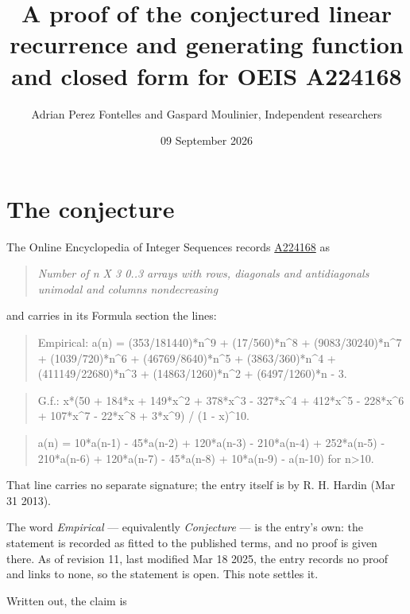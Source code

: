 \documentclass[11pt]{article}
\title{A proof of the conjectured linear recurrence and generating function and closed form for OEIS A224168}
\author{Adrian Perez Fontelles and Gaspard Moulinier, Independent researchers}
\date{09 September 2026}
\theoremstyle{definition}
\begin{document}
\maketitle
\section{The conjecture}

The Online Encyclopedia of Integer Sequences records \href{https://oeis.org/A224168}{A224168} as

\begin{quote}\itshape Number of n X 3 0..3 arrays with rows, diagonals and antidiagonals unimodal and columns nondecreasing\end{quote}

and carries in its Formula section the lines:

\begin{quote}\ttfamily Empirical: a(n) = (353/181440)*n\textasciicircum{}9 + (17/560)*n\textasciicircum{}8 + (9083/30240)*n\textasciicircum{}7 + (1039/720)*n\textasciicircum{}6 + (46769/8640)*n\textasciicircum{}5 + (3863/360)*n\textasciicircum{}4 + (411149/22680)*n\textasciicircum{}3 + (14863/1260)*n\textasciicircum{}2 + (6497/1260)*n - 3.\end{quote}

\begin{quote}\ttfamily G.f.: x*(50 + 184*x + 149*x\textasciicircum{}2 + 378*x\textasciicircum{}3 - 327*x\textasciicircum{}4 + 412*x\textasciicircum{}5 - 228*x\textasciicircum{}6 + 107*x\textasciicircum{}7 - 22*x\textasciicircum{}8 + 3*x\textasciicircum{}9) / (1 - x)\textasciicircum{}10.\end{quote}

\begin{quote}\ttfamily a(n) = 10*a(n-1) - 45*a(n-2) + 120*a(n-3) - 210*a(n-4) + 252*a(n-5) - 210*a(n-6) + 120*a(n-7) - 45*a(n-8) + 10*a(n-9) - a(n-10) for n>10.\end{quote}

That line carries no separate signature; the entry itself is by R. H. Hardin (Mar 31 2013).

The word {\itshape Empirical} --- equivalently {\itshape Conjecture} --- is the entry's own: the statement is recorded as fitted to the published terms, and no proof is given there. As of revision 11, last modified Mar 18 2025, the entry records no proof and links to none, so the statement is open. This note settles it.

Written out, the claim is
\end{document}
